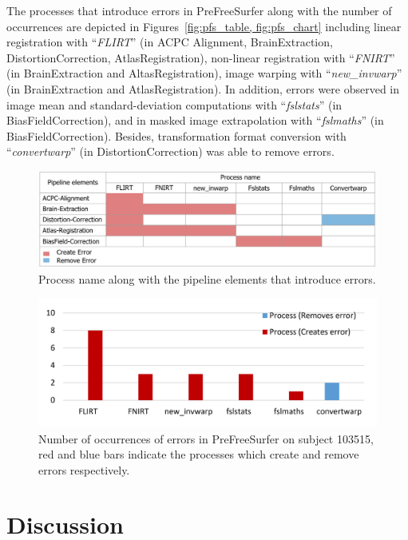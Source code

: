 \documentclass[a4paper,num-refs]{oup-contemporary}
\begin{document}
The processes that introduce errors in PreFreeSurfer along with the 
number of occurrences are depicted in Figures~\ref{fig:pfs_table, 
fig:pfs_chart} including linear registration with “\emph{FLIRT}” (in 
ACPC Alignment, BrainExtraction, DistortionCorrection, 
AtlasRegistration), non-linear registration with “\emph{FNIRT}” (in 
BrainExtraction and AltasRegistration), image warping with 
“\emph{new\_invwarp}” (in BrainExtraction and AtlasRegistration).  In 
addition, errors were observed in image mean and standard-deviation 
computations with “\emph{fslstats}” (in BiasFieldCorrection), and in 
masked image extrapolation with “\emph{fslmaths}” (in 
BiasFieldCorrection).  Besides, transformation format conversion with 
“\emph{convertwarp}” (in DistortionCorrection) was able to remove 
errors.

\begin{figure}
\centering
  \includegraphics[width=\columnwidth]{images/pfs_table.png}
  \caption{Process name along with the pipeline elements that introduce 
  errors.}
  \label{fig:pfs_table}
\end{figure}

\begin{figure}
\centering
  \includegraphics[width=\columnwidth]{images/pfs_chart.png} \caption{Number 
  of occurrences of errors in PreFreeSurfer on subject 103515, red and 
  blue bars indicate the processes which create and remove errors 
  respectively.} 
  \label{fig:pfs_chart}
\end{figure}


\section{Discussion}
\end{document}
